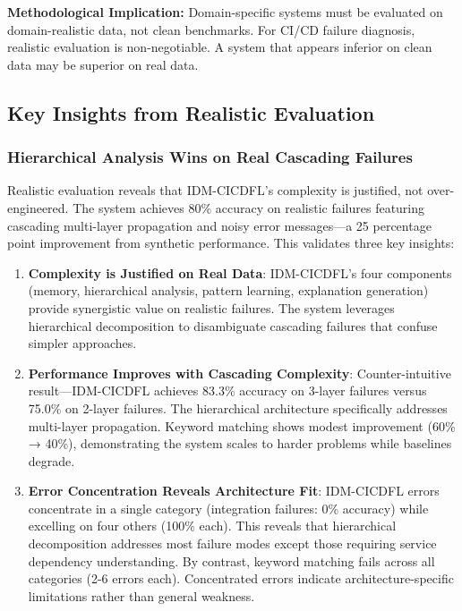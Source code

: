 \documentclass[11pt]{article}
\begin{document}
\textbf{Methodological Implication:} Domain-specific systems must be evaluated on domain-realistic data, not clean benchmarks. For CI/CD failure diagnosis, realistic evaluation is non-negotiable. A system that appears inferior on clean data may be superior on real data.

\subsection{Key Insights from Realistic Evaluation}

\subsubsection{Hierarchical Analysis Wins on Real Cascading Failures}

Realistic evaluation reveals that IDM-CICDFL's complexity is justified, not over-engineered. The system achieves 80\% accuracy on realistic failures featuring cascading multi-layer propagation and noisy error messages—a 25 percentage point improvement from synthetic performance. This validates three key insights:

\begin{enumerate}
    \item \textbf{Complexity is Justified on Real Data}: IDM-CICDFL's four components (memory, hierarchical analysis, pattern learning, explanation generation) provide synergistic value on realistic failures. The system leverages hierarchical decomposition to disambiguate cascading failures that confuse simpler approaches.

    \item \textbf{Performance Improves with Cascading Complexity}: Counter-intuitive result—IDM-CICDFL achieves 83.3\% accuracy on 3-layer failures versus 75.0\% on 2-layer failures. The hierarchical architecture specifically addresses multi-layer propagation. Keyword matching shows modest improvement (60\% → 40\%), demonstrating the system scales to harder problems while baselines degrade.

    \item \textbf{Error Concentration Reveals Architecture Fit}: IDM-CICDFL errors concentrate in a single category (integration failures: 0\% accuracy) while excelling on four others (100\% each). This reveals that hierarchical decomposition addresses most failure modes except those requiring service dependency understanding. By contrast, keyword matching fails across all categories (2-6 errors each). Concentrated errors indicate architecture-specific limitations rather than general weakness.
\end{enumerate}
\end{document}
